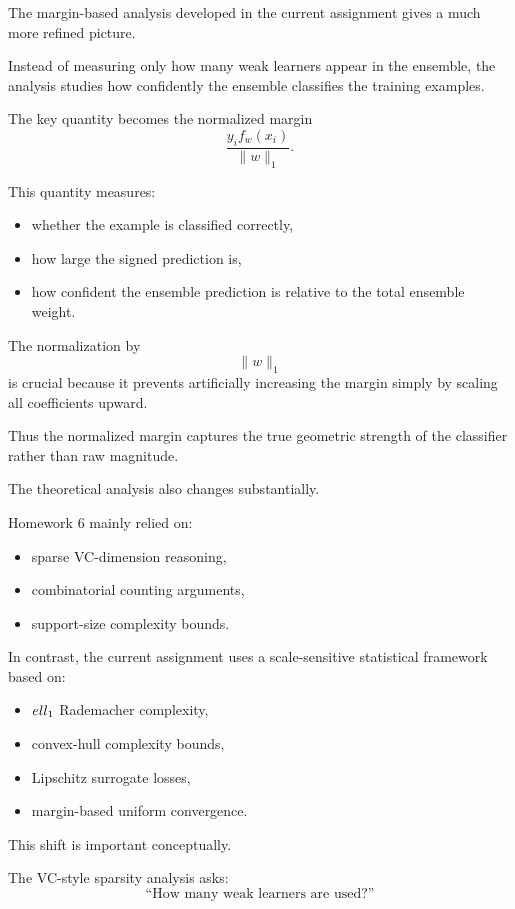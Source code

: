 \documentclass[11pt]{article}
\begin{document}
\begin{enumerate}
\begin{solutionbox}
\medskip

The margin-based analysis developed in the current assignment gives a much more refined picture.

Instead of measuring only how many weak learners appear in the ensemble, the analysis studies how confidently the ensemble classifies the training examples.

The key quantity becomes the normalized margin
\[
\frac{
y_if_w(x_i)
}{
\|w\|_1
}.
\]

This quantity measures:
\begin{itemize}
    \item whether the example is classified correctly,
    \item how large the signed prediction is,
    \item how confident the ensemble prediction is relative to the total ensemble weight.
\end{itemize}

The normalization by
\[
\|w\|_1
\]
is crucial because it prevents artificially increasing the margin simply by scaling all coefficients upward.

Thus the normalized margin captures the true geometric strength of the classifier rather than raw magnitude.

\medskip

The theoretical analysis also changes substantially.

Homework 6 mainly relied on:
\begin{itemize}
    \item sparse VC-dimension reasoning,
    \item combinatorial counting arguments,
    \item support-size complexity bounds.
\end{itemize}

In contrast, the current assignment uses a scale-sensitive statistical framework based on:
\begin{itemize}
    \item $\\ell_1$ Rademacher complexity,
    \item convex-hull complexity bounds,
    \item Lipschitz surrogate losses,
    \item margin-based uniform convergence.
\end{itemize}

This shift is important conceptually.

The VC-style sparsity analysis asks:
\[
\text{``How many weak learners are used?''}
\]


\end{solutionbox}
\end{enumerate}
\end{document}

